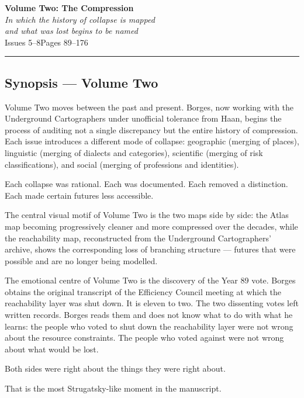 \documentclass[11pt, letterpaper]{article}
\newenvironment{action}{%
  \begin{onehalfspace}\noindent
}{%
  \end{onehalfspace}
}
\newcounter{panelcount}
\newcommand{\issuetitle}[3]{%
  \newpage
  \thispagestyle{empty}
  \vspace*{3cm}
  \begin{center}
    {\color{atlasblue}\Huge\bfseries #1}\\[0.8em]
    {\large\itshape #2}\\[2em]
    {\normalsize\color{notegray} #3}
  \end{center}
  \vspace{2cm}
  \hrule
  \newpage
  \setcounter{panelcount}{0}
}
\begin{document}
\newpage


\issuetitle
  {Volume Two: The Compression}
  {In which the history of collapse is mapped\\
  and what was lost begins to be named}
  {Issues 5–8\quad Pages 89–176}

\subsection*{Synopsis — Volume Two}

\begin{action}
Volume Two moves between the past and present. Borges, now working with the
Underground Cartographers under unofficial tolerance from Haan, begins the
process of auditing not a single discrepancy but the entire history of
compression. Each issue introduces a different mode of collapse: geographic
(merging of places), linguistic (merging of dialects and categories), scientific
(merging of risk classifications), and social (merging of professions and
identities).

Each collapse was rational. Each was documented. Each removed a distinction.
Each made certain futures less accessible.

The central visual motif of Volume Two is the two maps side by side: the
Atlas map becoming progressively cleaner and more compressed over the decades,
while the reachability map, reconstructed from the Underground Cartographers'
archive, shows the corresponding loss of branching structure — futures that
were possible and are no longer being modelled.

The emotional centre of Volume Two is the discovery of the Year 89 vote. Borges
obtains the original transcript of the Efficiency Council meeting at which the
reachability layer was shut down. It is eleven to two. The two dissenting votes
left written records. Borges reads them and does not know what to do with what
he learns: the people who voted to shut down the reachability layer were not
wrong about the resource constraints. The people who voted against were not
wrong about what would be lost.

Both sides were right about the things they were right about.

That is the most Strugatsky-like moment in the manuscript.
\end{action}
\end{document}
